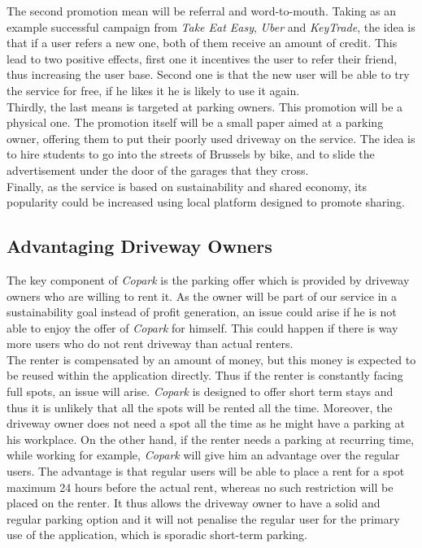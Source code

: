 \documentclass[12pt,a4paper,oneside]{book}
\newcommand{\bp}{\textit{Copark}}
\begin{document}
The second promotion mean will be referral and word-to-mouth. Taking as an example successful campaign from \textit{Take Eat Easy}, \textit{Uber} and \textit{KeyTrade}, the idea is that if a user refers a new one, both of them receive an amount of credit. This lead to two positive effects, first one it incentives the user to refer their friend, thus increasing the user base. Second one is that the new user will be able to try the service for free, if he likes it he is likely to use it again.\\

Thirdly, the last means is targeted at parking owners. This promotion will be a physical one. The promotion itself will be a small paper aimed at a parking owner, offering them to put their poorly used driveway on the service. The idea is to hire students to go into the streets of Brussels by bike, and to slide the advertisement under the door of the garages that they cross.\\

Finally, as the service is based on sustainability and shared economy, its popularity could be increased using local platform designed to promote sharing.\\

\subsection{Advantaging Driveway Owners}
\label{advdo}
The key component of \bp{} is the parking offer which is provided by driveway owners who are willing to rent it. As the owner will be part of our service in a sustainability goal instead of profit generation, an issue could arise if he is not able to enjoy the offer of \bp{} for himself. This could happen if there is way more users who do not rent driveway than actual renters.\\

The renter is compensated by an amount of money, but this money is expected to be reused within the application directly. Thus if the renter is constantly facing full spots, an issue will arise. \bp{} is designed to offer short term stays and thus it is unlikely that all the spots will be rented all the time. Moreover, the driveway owner does not need a spot all the time as he might have a parking at his workplace. On the other hand, if the renter needs a parking at recurring time, while working for example, \bp{} will give him an advantage over the regular users. The advantage is that regular users will be able to place a rent for a spot maximum 24 hours before the actual rent, whereas no such restriction will be placed on the renter. It thus allows the driveway owner to have a solid and regular parking option and it will not penalise the regular user for the primary use of the application, which is sporadic short-term parking.\\
\end{document}
